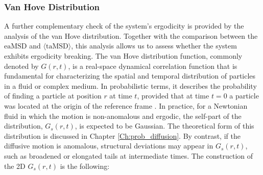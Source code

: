 \subsubsection{Van Hove Distribution}\label{Ch:Van_Hove_dist}
A further complementary check of the system's ergodicity is provided by the analysis of the van Hove distribution. Together with the comparison between the $\mathrm{eaMSD}$ and $\langle \mathrm{taMSD} \rangle$, this analysis allows us to assess whether the system exhibits ergodicity breaking.
The van Hove distribution function, commonly denoted by $G(r,t)$, is a real-space dynamical correlation function that is fundamental for characterizing the spatial and temporal distribution of particles in a fluid or complex medium.
In probabilistic terms, it describes the probability of finding a particle at position $r$ at time $t$, provided that at time $t = 0$ a particle was located at the origin of the reference frame \cite{szymanski2010elucidating}. In practice, for a Newtonian fluid in which the motion is non-anomalous and ergodic, the self-part of the distribution, $G_s(r,t)$, is expected to be Gaussian. The theoretical form of this distribution is discussed in Chapter \ref{Ch:prob_diffusion}. By contrast, if the diffusive motion is anomalous, structural deviations may appear in $G_s(r,t)$, such as broadened or elongated tails at intermediate times. The construction of the 2D $G_s(r,t)$ is the following: 
